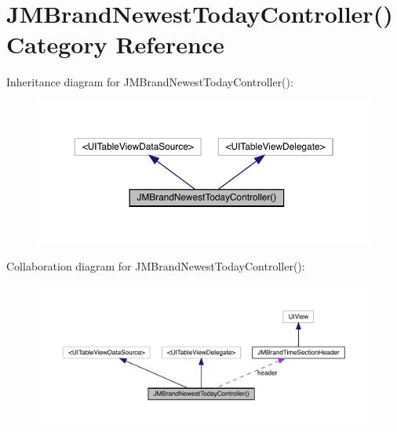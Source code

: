 \hypertarget{category_j_m_brand_newest_today_controller_07_08}{}\section{J\+M\+Brand\+Newest\+Today\+Controller() Category Reference}
\label{category_j_m_brand_newest_today_controller_07_08}


Inheritance diagram for J\+M\+Brand\+Newest\+Today\+Controller()\+:\nopagebreak
\begin{figure}[H]
\begin{center}
\leavevmode
\includegraphics[width=350pt]{category_j_m_brand_newest_today_controller_07_08__inherit__graph}
\end{center}
\end{figure}


Collaboration diagram for J\+M\+Brand\+Newest\+Today\+Controller()\+:\nopagebreak
\begin{figure}[H]
\begin{center}
\leavevmode
\includegraphics[width=350pt]{category_j_m_brand_newest_today_controller_07_08__coll__graph}
\end{center}
\end{figure}
